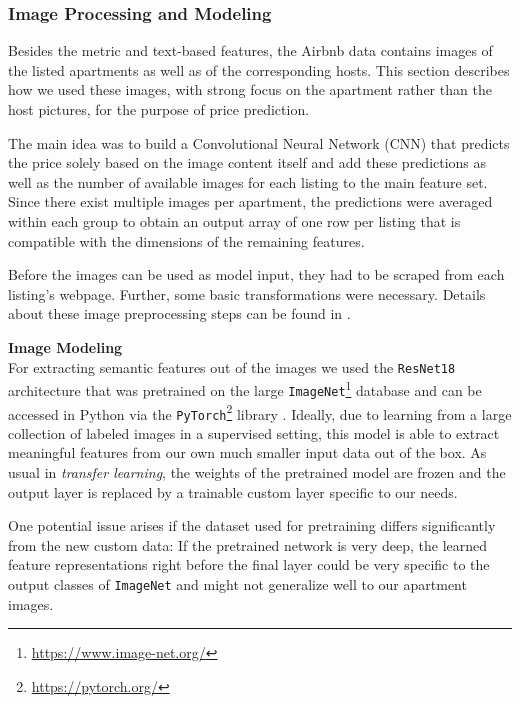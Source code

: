 \subsubsection{Image Processing and Modeling}

Besides the metric and text-based features, the Airbnb data contains images of the listed apartments as well as of the corresponding hosts.
This section describes how we used these images, with strong focus on the apartment rather than the host pictures, for the purpose of price prediction.

The main idea was to build a Convolutional Neural Network (CNN) that predicts the price solely based on the image content itself and add these predictions as well as the number of available images for each listing to the main feature set.
Since there exist multiple images per apartment, the predictions were averaged within each group to obtain an output array of one row per listing that is compatible with the dimensions of the remaining features.

Before the images can be used as model input, they had to be scraped from each listing's webpage.
Further, some basic transformations were necessary.
Details about these image preprocessing steps can be found in .


\textbf{Image Modeling} \\
For extracting semantic features out of the images we used the \texttt{ResNet18} architecture that was pretrained on the large \texttt{ImageNet}\footnote{\url{https://www.image-net.org/}} database \citep{russakovsky2015} and can be accessed in Python via the \texttt{PyTorch}\footnote{\url{https://pytorch.org/}} library \citep{paszke2019}.
Ideally, due to learning from a large collection of labeled images in a supervised setting, this model is able to extract meaningful features from our own much smaller input data out of the box.
As usual in \emph{transfer learning}, the weights of the pretrained model are frozen and the output layer is replaced by a trainable custom layer specific to our needs.

One potential issue arises if the dataset used for pretraining differs significantly from the new custom data:
If the pretrained network is very deep, the learned feature representations right before the final layer could be very specific to the output classes of \texttt{ImageNet} and might not generalize well to our apartment images.

